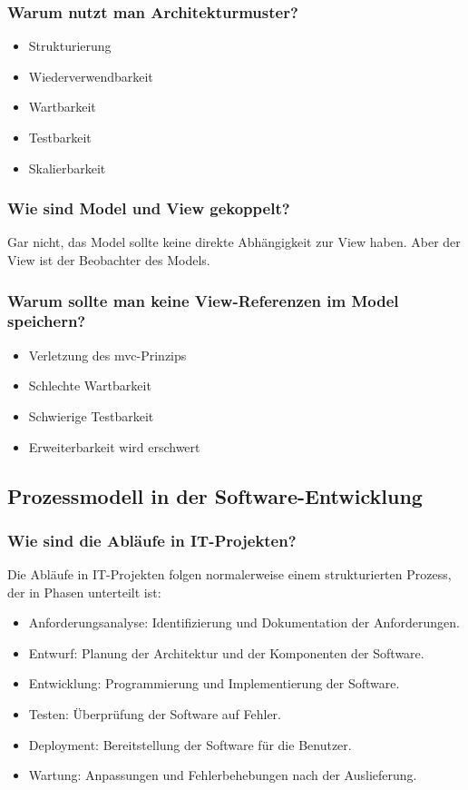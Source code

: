 \documentclass[main.tex]{subfiles}
\begin{document}
\subsubsection*{Warum nutzt man \gls{Architekturmuster}?}
\begin{itemize}
    \item Strukturierung
    \item Wiederverwendbarkeit
    \item Wartbarkeit
    \item Testbarkeit
    \item Skalierbarkeit
\end{itemize}
\subsubsection*{Wie sind Model und View gekoppelt?}
Gar nicht, das Model sollte keine direkte Abhängigkeit zur View haben. Aber der View ist der Beobachter des Models.  
\subsubsection*{Warum sollte man keine View-Referenzen im Model speichern?}
\begin{itemize}
    \item Verletzung des \gls{mvc}-Prinzips
    \item Schlechte Wartbarkeit
    \item Schwierige Testbarkeit
    \item Erweiterbarkeit wird erschwert
\end{itemize}

\subsection{Prozessmodell in der Software-Entwicklung}
\subsubsection*{Wie sind die Abläufe in IT-Projekten?}
Die Abläufe in IT-Projekten folgen normalerweise einem strukturierten Prozess, der in Phasen unterteilt ist:
\begin{itemize}
    \item Anforderungsanalyse: Identifizierung und Dokumentation der Anforderungen.
    \item Entwurf: Planung der Architektur und der Komponenten der Software.
    \item Entwicklung: Programmierung und Implementierung der Software.
    \item Testen: Überprüfung der Software auf Fehler.
    \item Deployment: Bereitstellung der Software für die Benutzer.
    \item Wartung: Anpassungen und Fehlerbehebungen nach der Auslieferung.
\end{itemize}
\end{document}
